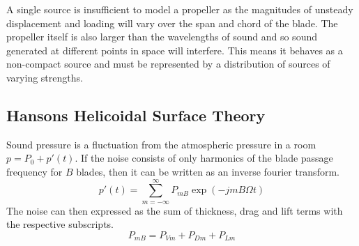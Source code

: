 \documentclass{article}
\begin{document}
A single source is insufficient to model a propeller as the magnitudes of unsteady displacement and loading will vary over the span and chord of the blade.
The propeller itself is also larger than the wavelengths of sound and so sound generated at different points in space will interfere.
This means it behaves as a non-compact source and must be represented by a distribution of sources of varying strengths.

\subsection{Hansons Helicoidal Surface Theory}
Sound pressure is a fluctuation from the atmospheric pressure in a room $p = P_0 + p'(t)$.
If the noise consists of only harmonics of the blade passage frequency for $B$ blades, then it can be written as an inverse fourier transform.
\begin{equation}
    p'(t) = \sum_{m=-\infty}^\infty P_{mB} \exp(-jmB\Omega t)
\end{equation}
The noise can then expressed as the sum of thickness, drag and lift terms with the respective subscripts.
\begin{equation}
    P_{mB} = P_{Vm} + P_{Dm} + P_{Lm}
\end{equation}
\end{document}
